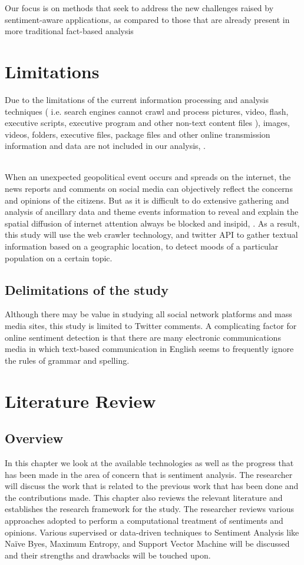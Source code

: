 Our focus is on methods that seek to address the new challenges raised by sentiment-aware
applications, as compared to those that are already present in more traditional fact-based analysis


\section{Limitations}
Due to the limitations of the current information processing and analysis techniques ( i.e. search
engines cannot crawl and process pictures, video, flash, executive scripts, executive program and
other non-text content files ), images, videos, folders, executive files, package files and other
online transmission information and data are not included in our analysis, \cite{ref22}.


\leavevmode\\
When an unexpected geopolitical event occurs and spreads on the internet, the news reports and
comments on social media can objectively reflect the concerns and opinions of the citizens. But as it is difficult to do extensive gathering and analysis of ancillary data and theme
events information to reveal and explain the spatial diffusion of internet attention always be
blocked and insipid, \cite{ref22}. As a result, this study will use the web crawler
technology, and twitter API to gather textual information based on a geographic location, to detect moods
of a particular population on a certain topic.


\subsection{Delimitations of the study}
Although there may be value in studying all social network platforms and mass media sites, this study is limited to Twitter comments. A complicating factor for online sentiment detection is that there are many electronic communications media in which text-based communication in English seems to frequently ignore
the rules of grammar and spelling.


\section{Literature Review}
\subsection{Overview}
In this chapter we look at the available technologies as well as the progress that has been
made in the area of concern that is sentiment analysis. The researcher will discuss the work that is
related to the previous work that has been done and the contributions made. This chapter also
reviews the relevant literature and establishes the research framework for the study. The researcher
reviews various approaches adopted to perform a computational treatment of sentiments and
opinions. Various supervised or data-driven techniques to Sentiment Analysis like Naïve Byes,
Maximum Entropy, and Support Vector Machine will be discussed and their strengths and drawbacks will be touched upon.


